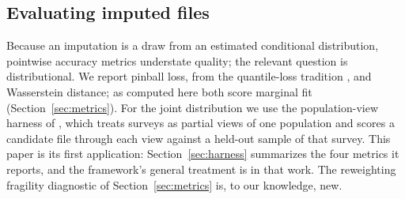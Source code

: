 \subsection{Evaluating imputed files}

Because an imputation is a draw from an estimated conditional distribution,
pointwise accuracy metrics understate quality; the relevant question is
distributional. We report pinball loss, from the quantile-loss tradition
\citep{koenker2005quantile, meinshausen2006quantile}, and Wasserstein
distance; as computed here both score marginal fit
(Section~\ref{sec:metrics}). For the joint distribution we use the
population-view harness of \citet{ghenis2026popdgp}, which treats surveys as
partial views of one population and scores a candidate file through each
view against a held-out sample of that survey. This paper is its first
application: Section~\ref{sec:harness} summarizes the four metrics it
reports, and the framework's general treatment is in that work. The
reweighting fragility diagnostic of Section~\ref{sec:metrics} is, to our
knowledge, new.
